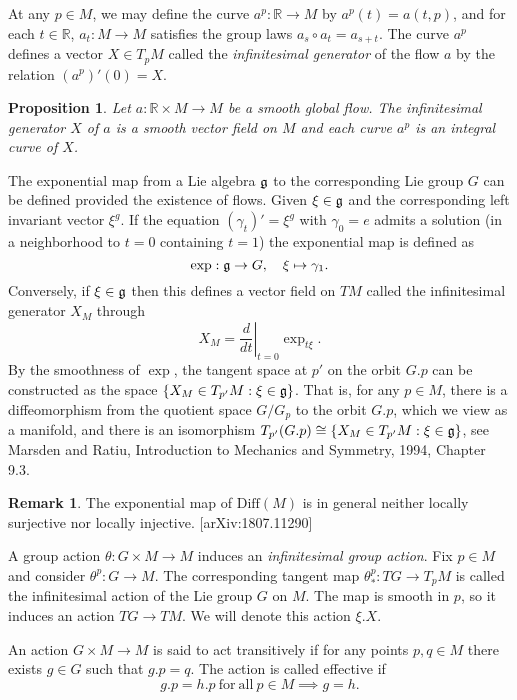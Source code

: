\documentclass{article}
\theoremstyle{plain}
\newtheorem{prop}[teo]{Proposition}
\theoremstyle{definition}
\newtheorem{oss}[teo]{Remark}
\numberwithin{equation}{section}
\newcommand{\R}{\ensuremath{\mathbb{R}}}
\newcommand{\Diff}{\ensuremath{\mathrm{Diff}}}
\newcommand{\mf}{\ensuremath{\mathfrak}}
\begin{document}
At any $p\in M$, we may define the curve $a^p:\R\to M$ by $a^p(t)=a(t,p)$, and for each $t\in\R$, $a_t:M\to M$ satisfies the group laws $a_s\circ a_t=a_{s+t}$. The curve $a^p$ defines a vector $X\in T_pM$ called the \textit{infinitesimal generator} of the flow $a$ by the relation $(a^p)'(0)=X$.

\begin{prop}
	Let $a:\R\times M\to M$ be a smooth global flow. The infinitesimal generator $X$ of $a$ is a smooth vector field on $M$ and each curve $a^p$ is an integral curve of $X$.
\end{prop}

The exponential map from a Lie algebra $\mf g$ to the corresponding Lie group $G$ can be defined provided the existence of flows. Given $\xi\in\mf g$ and the corresponding left invariant vector $\xi^g$. If the equation $(\gamma_t)'=\xi^g$ with $\gamma_0=e$ admits a solution (in a neighborhood to $t=0$ containing $t=1$) the exponential map is defined as
\[
\exp: \mf g\to G,\quad \xi \mapsto \gamma_1.
\]
Conversely, if $\xi\in \mf g$ then this defines a vector field on $TM$ called the infinitesimal generator $X_M$ through
\[
X_M=\left.\frac{d}{dt}\right|_{t=0}\exp_{t\xi}.
\]
By the smoothness of $\exp$, the tangent space at $p'$ on the orbit $G.p$ can be constructed as the space $\{X_M\in T_{p'}M : \xi\in\mf g\}$. That is, for any $p\in M$, there is a diffeomorphism from the quotient space $G/G_{p}$ to the orbit $G.p$, which we view as a manifold, and there is an isomorphism $T_{p'}(G.p)\cong\{X_M\in T_{p'}M : \xi\in\mf g\}$, see Marsden and Ratiu, Introduction to Mechanics and Symmetry, 1994, Chapter 9.3.

\begin{oss}
	The exponential map of $\Diff(M)$ is in general neither locally surjective nor locally injective. [arXiv:1807.11290]
\end{oss}

A group action $\theta:G\times M\to M$ induces an \textit{infinitesimal group action}. Fix $p\in M$ and consider $\theta^p:G\to M$. The corresponding tangent map $\theta^p_*:TG\to T_pM$ is called the infinitesimal action of the Lie group $G$ on $M$. The map is smooth in $p$, so it induces an action $TG\to TM$. We will denote this action $\xi.X$. 

An action $G\times M\to M$ is said to act transitively if for any points $p,q\in M$ there exists $g\in G$ such that $g.p=q$. The action is called effective if
\[
g.p=h.p\ \mathrm{for}\ \mathrm{all}\ p\in M \implies g=h.
\]
\end{document}
